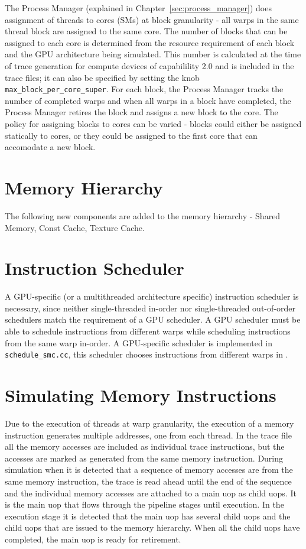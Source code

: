 The Process Manager (explained in Chapter~\ref{sec:process_manager})
does assignment of threads to cores (SMs) at block granularity - all
warps in the same thread block are assigned to the same core. The
number of blocks that can be assigned to each core is determined from
the resource requirement of each block and the GPU architecture being
simulated.  This number is calculated at the time of trace generation
for compute devices of capabilility 2.0 and is included in the trace
files; it can also be specified by setting the knob
\Verb+max_block_per_core_super+.  For each block, the Process Manager
tracks the number of completed warps and when all warps in a block
have completed, the Process Manager retires the block and assigns a
new block to the core. The policy for assigning blocks to cores can be
varied - blocks could either be assigned statically to cores, or they
could be assigned to the first core that can accomodate a new block.


\section{Memory Hierarchy}

The following new components are added to the memory hierarchy - Shared Memory,
    Const Cache, Texture Cache.

\section{Instruction Scheduler}

A GPU-specific (or a multithreaded architecture specific) instruction
scheduler is necessary, since neither single-threaded in-order nor
single-threaded out-of-order schedulers match the requirement of a GPU
scheduler. A GPU scheduler must be able to schedule instructions from
different warps while scheduling instructions from the same warp
in-order. A GPU-specific scheduler is implemented in
\Verb+schedule_smc.cc+, this scheduler chooses instructions from
different warps in .

\section{Simulating Memory Instructions}

Due to the execution of threads at warp granularity, the execution of a memory
instruction generates multiple addresses, one from each thread. In the trace
file all the memory accesses are included as individual trace instructions, but
the accesses are marked as generated from the same memory instruction. During
simulation when it is detected that a sequence of memory accesses are from the
same memory instruction, the trace is read ahead until the end of the sequence
and the individual memory accesses are attached to a main uop as child uops. It
is the main uop that flows through the pipeline stages until execution. In the
execution stage it is detected that the main uop has several child uops and the
child uops that are issued to the memory hierarchy. When all the child uops
have completed, the main uop is ready for retirement.


